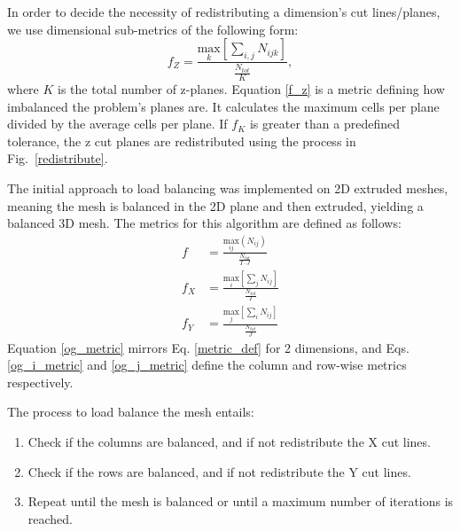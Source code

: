 \documentclass[times,final]{elsarticle}
\begin{document}
In order to decide the necessity of redistributing a dimension's cut lines/planes, we use dimensional sub-metrics of the following form:
\begin{equation}
f_{Z} = \frac{\underset{k}{\text{max}}[\sum_{i,j} N_{ijk}]}{\frac{N_{tot}}{K}},
\label{f_z}
\end{equation}
where $K$ is the total number of z-planes.
Equation \ref{f_z} is a metric defining how imbalanced the problem's planes are. It calculates the maximum cells per plane divided by the average cells per plane. If $f_K$ is greater than a predefined tolerance, the z cut planes are redistributed using the process in Fig.~\ref{redistribute}.

The initial approach to load balancing was implemented on 2D extruded meshes, meaning the mesh is balanced in the 2D plane and then extruded, yielding a balanced 3D mesh. The metrics for this algorithm are defined as follows:
\begin{align}
f &= \frac{\underset{ij}{\text{max}}(N_{ij})}{\frac{N_{tot}}{I\cdot J}}  \label{og_metric}\\
f_X &= \frac{\underset{i}{\text{max}}[\sum_{j} N_{ij}] } {\frac{N_{tot}}{I}} \label{og_i_metric} \\
f_Y &= \frac{\underset{j}{\text{max}}[\sum_{i} N_{ij}] } {\frac{N_{tot}}{J}} \label{og_j_metric}
\end{align}
Equation \ref{og_metric} mirrors Eq. \ref{metric_def} for 2 dimensions, and Eqs. \ref{og_i_metric} and \ref{og_j_metric} define the column and row-wise metrics respectively.

%
The process to load balance the mesh entails:
\begin{enumerate}
  \item Check if the columns are balanced, and if not redistribute the X cut lines.
  \item Check if the rows are balanced, and if not redistribute the Y cut lines.
  \item Repeat until the mesh is balanced or until a maximum number of iterations is reached.
\end{enumerate}
\end{document}
